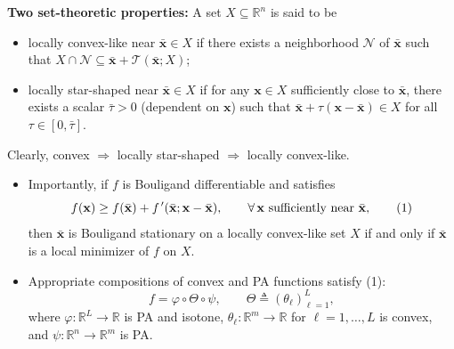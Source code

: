 \documentclass[aspectratio=169,xcolor=dvipsnames]{beamer}
\newcommand{\fp}{f\mkern2mu'}
\begin{document}
\begin{frame}
  \footnotesize
  \setlength{\abovedisplayskip}{4pt}
  \setlength{\belowdisplayskip}{4pt}
  \setlength{\abovedisplayshortskip}{3pt}
  \setlength{\belowdisplayshortskip}{3pt}

  \textbf{Two set-theoretic properties:} A set $X\subseteq\mathbb{R}^n$ is
  said to be
  \begin{itemize}
    \setlength{\itemsep}{0.06cm}
    \item {\color{MediumBlue}locally convex-like} near
      $\bar{\mathbf{x}}\in X$ if there exists a neighborhood $\mathcal{N}$ of
      $\bar{\mathbf{x}}$ such that
      $X\cap\mathcal{N}\subseteq\bar{\mathbf{x}}
      +\mathcal{T}(\bar{\mathbf{x}};X)$;
    \item {\color{MediumBlue}locally star-shaped} near
      $\bar{\mathbf{x}}\in X$ if for any $\mathbf{x}\in X$ sufficiently close
      to $\bar{\mathbf{x}}$, there exists a scalar $\bar{\tau}>0$ (dependent
      on $\mathbf{x}$) such that
      $\bar{\mathbf{x}}+\tau(\mathbf{x}-\bar{\mathbf{x}})\in X$ for all
      $\tau\in[0,\bar{\tau}]$.
  \end{itemize}

  \vspace{0.04cm}
  Clearly, convex $\Rightarrow$ locally star-shaped $\Rightarrow$ locally
  convex-like.

  \vspace{0.06cm}
  \begin{itemize}
    \setlength{\itemsep}{0.10cm}
    \item Importantly, if $f$ is Bouligand differentiable and satisfies
      \[
        f(\mathbf{x})\geq f(\bar{\mathbf{x}})
        +\fp (\bar{\mathbf{x}};\mathbf{x}-\bar{\mathbf{x}}),\qquad
        \forall\,\mathbf{x}\text{ sufficiently near }\bar{\mathbf{x}},
        \tag{1}
      \]
      then $\bar{\mathbf{x}}$ is {\color{MediumBlue}Bouligand stationary} on
      a locally convex-like set $X$ if and only if $\bar{\mathbf{x}}$ is a
      \textcolor{MediumRed}{local minimizer} of $f$ on $X$.
    \item Appropriate compositions of convex and PA functions satisfy (1):
      \[
        f=\varphi\circ\Theta\circ\psi,\qquad
        \Theta\triangleq(\theta_{\ell})_{\ell=1}^{L},
      \]
      where $\varphi:\mathbb{R}^L\to\mathbb{R}$ is PA and
      \textcolor{MediumRed}{isotone}, $\theta_{\ell}:\mathbb{R}^m\to\mathbb{R}$
      for $\ell=1,\ldots,L$ is convex, and $\psi:\mathbb{R}^n\to\mathbb{R}^m$
      is PA.
  \end{itemize}
\end{frame}
\end{document}
